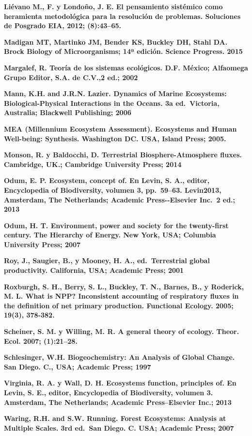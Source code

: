 \documentclass[
]{article}
\begin{document}
\textbf{Liévano M., F. y Londoño, J. E. El pensamiento sistémico como
heramienta metodológica para la resolución de problemas. Soluciones de
Posgrado EIA, 2012; (8):43--65.}

\textbf{Madigan MT, Martinko JM, Bender KS, Buckley DH, Stahl DA. Brock
Biology of Microorganisms; 14ª edición. Science Progress. 2015}

\textbf{Margalef, R. Teoría de los sistemas ecológicos. D.F. México;
Alfaomega Grupo Editor, S.A. de C.V.,2 ed.; 2002}

\textbf{Mann, K.H. and J.R.N. Lazier. Dynamics of Marine Ecosystems:
Biological-Physical Interactions in the Oceans. 3a ed.~Victoria,
Australia; Blackwell Publishing; 2006}

\textbf{MEA (Millennium Ecosystem Assessment). Ecosystems and Human
Well-being: Synthesis. Washington DC. USA, Island Press; 2005.}

\textbf{Monson, R. y Baldocchi, D. Terrestrial Biosphere-Atmosphere
fluxes. Cambridge, UK.; Cambridge University Press; 2014}

\textbf{Odum, E. P. Ecosystem, concept of. En Levin, S. A., editor,
Encyclopedia of Biodiversity, volumen 3, pp.~59--63. Levin2013,
Amsterdam, The Netherlands; Academic Press-\/-Elsevier Inc.~2 ed.; 2013}

\textbf{Odum, H. T. Environment, power and society for the twenty-first
century. The Hierarchy of Energy. New York, USA; Columbia University
Press; 2007}

\textbf{Roy, J., Saugier, B., y Mooney, H. A., ed.~Terrestrial global
productivity. California, USA; Academic Press; 2001}

\textbf{Roxburgh, S. H., Berry, S. L., Buckley, T. N., Barnes, B., y
Roderick, M. L. What is NPP? Inconsistent accounting of respiratory
fluxes in the definition of net primary production. Functional Ecology.
2005; 19(3), 378-382.}

\textbf{Scheiner, S. M. y Willing, M. R. A general theory of ecology.
Theor. Ecol. 2007; (1):21--28.}

\textbf{Schlesinger, W.H. Biogeochemistry: An Analysis of Global Change.
San Diego. C., USA; Academic Press; 1997}

\textbf{Virginia, R. A. y Wall, D. H. Ecosystems function, principles
of. En Levin, S. E., editor, Encyclopedia of Biodiversity, volumen 3.
Amsterdam, The Netherlands; Academic Press--Elsevier Inc.; 2013}

\textbf{Waring, R.H. and S.W. Running. Forest Ecosystems: Analysis at
Multiple Scales. 3rd ed.~San Diego. C. USA; Academic Press; 2007}
\end{document}
